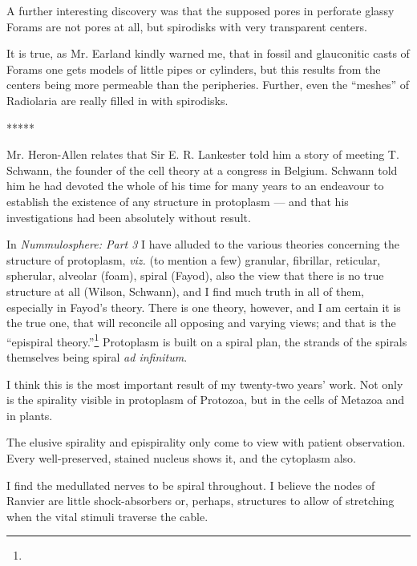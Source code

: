 \documentclass[a4paper, 12pt, oneside]{article}
\begin{document}
A further interesting discovery was that the supposed pores in perforate glassy Forams are not pores at all, but spirodisks with very transparent centers.

It is true, as Mr. Earland kindly warned me, that in fossil and glauconitic casts of Forams one gets models of little pipes or cylinders, but this results from the centers being more permeable than the peripheries. Further, even the ``meshes'' of Radiolaria are really filled in with spirodisks.

\centerline{*\hspace{15mm}*\hspace{15mm}*\hspace{15mm}*\hspace{15mm}*}
\bigskip

Mr. Heron-Allen relates that Sir E. R. Lankester told him a story of meeting T. Schwann, the founder of the cell theory at a congress in Belgium. Schwann told him he had devoted the whole of his time for many years to an endeavour to establish the existence of any structure in protoplasm --- and that his investigations had been absolutely without result.

In \emph{Nummulosphere: Part 3} I have alluded to the various theories concerning the structure of protoplasm, \emph{viz.} (to mention a few) granular, fibrillar, reticular, spherular, alveolar (foam), spiral (Fayod), also the view that there is no true structure at all (Wilson, Schwann), and I find much truth in all of them, especially in Fayod's theory. There is one theory, however, and I am certain it is the true one, that will reconcile all opposing and varying views; and that is the ``epispiral theory.''\footnote{} Protoplasm is built on a spiral plan, the strands of the spirals themselves being spiral \emph{ad infinitum}.

I think this is the most important result of my twenty-two years' work. Not only is the spirality visible in protoplasm of Protozoa, but in the cells of Metazoa and in plants.

The elusive spirality and epispirality only come to view with patient observation. Every well-preserved, stained nucleus shows it, and the cytoplasm also.

I find the medullated nerves to be spiral throughout. I believe the nodes of Ranvier are little shock-absorbers or, perhaps, structures to allow of stretching when the vital stimuli traverse the cable.
\end{document}
